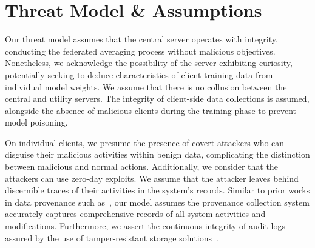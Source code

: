 
\section{Threat Model \& Assumptions}

Our threat model assumes that the central server operates with integrity, conducting the federated averaging process without malicious objectives. Nonetheless, we acknowledge the possibility of the server exhibiting curiosity, potentially seeking to deduce characteristics of client training data from individual model weights. We assume that there is no collusion between the central and utility servers. The integrity of client-side data collections is assumed, alongside the absence of malicious clients during the training phase to prevent model poisoning.

On individual clients, we presume the presence of covert attackers who can disguise their malicious activities within benign data, complicating the distinction between malicious and normal actions. Additionally, we consider that the attackers can use zero-day exploits. We assume that the attacker leaves behind discernible traces of their activities in the system's records. Similar to prior works in data provenance such as~\cite{nodoze2019,priotracker2018,mzx2016,bates2017transparent}, our model assumes the provenance collection system accurately captures comprehensive records of all system activities and modifications. Furthermore, we assert the continuous integrity of audit logs assured by the use of tamper-resistant storage solutions~\cite{paccagnella2020custos,hardlog}.
